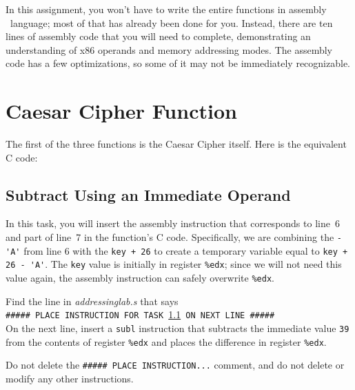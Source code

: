 \hspace{1cm}

In this assignment, you won't have to write the entire functions in assembly \
language; most of that has already been done for you. Instead, there are ten
lines of assembly code that you will need to complete, demonstrating an
understanding of x86 operands and memory addressing modes. The assembly code
has a few optimizations, so some of it may not be immediately recognizable.


\section{Caesar Cipher Function}

The first of the three functions is the Caesar Cipher itself. Here is the
equivalent C code:



\subsection{Subtract Using an Immediate Operand}\label{task1}

In this task, you will insert the assembly instruction that corresponds to
line~6 and part of line~7 in the function's C code. Specifically, we are
combining the \lstinline{-'A'} from line 6 with the \lstinline{key + 26} to
create a temporary variable equal to \lstinline{key + 26 - 'A'}. The
\lstinline{key} value is initially in register \lstinline{%edx}; since we will
not need this value again, the assembly instruction can safely overwrite
\lstinline{%edx}.

Find the line in \textit{addressinglab.s} that says \\
\texttt{\#\#\#\#\# PLACE INSTRUCTION FOR TASK \ref{task1} ON NEXT LINE \#\#\#\#\#} \\
On the next line, insert a \lstinline{subl} instruction that subtracts the
immediate value \lstinline{39} from the contents of register \lstinline{%edx}
and places the difference in register \lstinline{%edx}.


Do not delete the \texttt{\#\#\#\#\# PLACE INSTRUCTION...} comment, and do not
delete or modify any other instructions.

